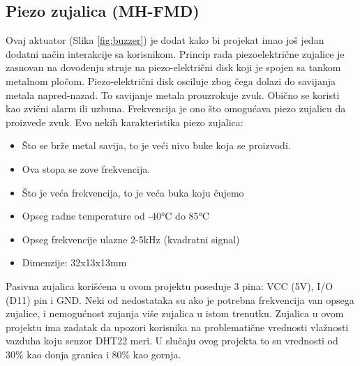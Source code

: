 \documentclass[a4paper, 12pt]{article}
\begin{document}
	\subsection{Piezo zujalica (MH-FMD)}
	
	Ovaj aktuator (Slika \ref{fig:buzzer}) je dodat kako bi projekat imao još jedan dodatni način interakcije sa korisnikom. Princip rada piezoelektrične zujalice je zasnovan na dovođenju struje na piezo-električni disk koji je spojen sa tankom metalnom pločom. Piezo-električni disk osciluje zbog čega dolazi do savijanja metala napred-nazad. To savijanje metala prouzrokuje zvuk. Obično se koristi kao zvični alarm ili uzbuna. Frekvencija je ono što omogućava piezo zujalicu da proizvede zvuk. Evo nekih karakteristika piezo zujalica:
\begin{itemize}
	\item Što se brže metal savija, to je veći nivo buke koja se proizvodi.
	\item Ova stopa se zove frekvencija.
	\item Što je veća frekvencija, to je veća buka koju čujemo
	\item Opseg radne temperature od -40°C do 85°C
	\item Opseg frekvencije ulazne 2-5kHz (kvadratni signal)
	\item Dimenzije: 32x13x13mm
\end{itemize}

\vspace{10pt}

	Pasivna zujalica korišćena u ovom projektu poseduje 3 pina: VCC (5V), I/O (D11) pin i GND. Neki od nedostataka su ako je potrebna frekvencija van opsega zujalice, i nemogućnost zujanja više zujalica u istom trenutku. Zujalica u ovom projektu ima zadatak da upozori korisnika na problematične vrednosti vlažnosti vazduha koju senzor DHT22 meri. U slučaju ovog projekta to su vrednosti od 30\% kao donja granica i 80\% kao gornja.
	
\end{document}

